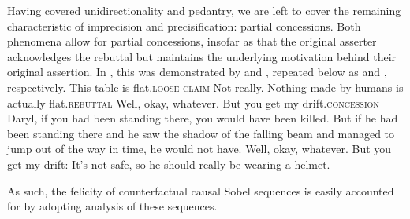 Having covered unidirectionality and pedantry, we are left to cover the remaining characteristic of imprecision and precisification: partial concessions. Both phenomena allow for partial concessions, insofar as that the original asserter acknowledges the rebuttal but maintains the underlying motivation behind their original assertion. In , this was demonstrated by  and , repeated below as  and , respectively.
\pex{}
\a{}This table is flat.\hfill{\scshape loose claim}
\a{}Not really. Nothing made by humans is actually flat.\hfill{\scshape rebuttal}
\a{}Well, okay, whatever. But you get my drift.\hfill{\scshape concession}\\
\emptyfill\parencite[p.~113]{Klecha2014}
\xe
\pex{}
			\a	{}Daryl, if you had been standing there, you would have been killed.
			\a	{}But if he had been standing there and he saw the shadow of the falling beam and managed to jump out of the way in time, he would not have.
			\a	{}Well, okay, whatever. But you get my drift: It's not safe, so he should really be wearing a helmet.\hfill\parencite[adapted from][p.~139]{Klecha2015}
\xe

\noindent As such, the felicity of counterfactual causal Sobel sequences is easily accounted for by adopting  analysis of these sequences.

